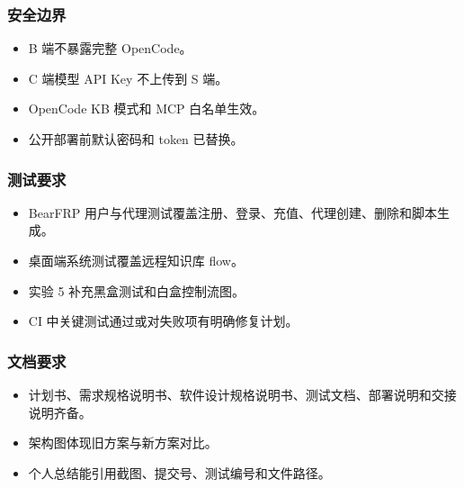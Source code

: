 \documentclass[UTF8,a4paper,12pt,fontset=fandol]{ctexart}
\begin{document}
\subsubsection{安全边界}
\begin{itemize}
  \item B 端不暴露完整 OpenCode。
  \item C 端模型 API Key 不上传到 S 端。
  \item OpenCode KB 模式和 MCP 白名单生效。
  \item 公开部署前默认密码和 token 已替换。
\end{itemize}

\subsubsection{测试要求}
\begin{itemize}
  \item BearFRP 用户与代理测试覆盖注册、登录、充值、代理创建、删除和脚本生成。
  \item 桌面端系统测试覆盖远程知识库 flow。
  \item 实验 5 补充黑盒测试和白盒控制流图。
  \item CI 中关键测试通过或对失败项有明确修复计划。
\end{itemize}

\subsubsection{文档要求}
\begin{itemize}
  \item 计划书、需求规格说明书、软件设计规格说明书、测试文档、部署说明和交接说明齐备。
  \item 架构图体现旧方案与新方案对比。
  \item 个人总结能引用截图、提交号、测试编号和文件路径。
\end{itemize}
\end{document}
